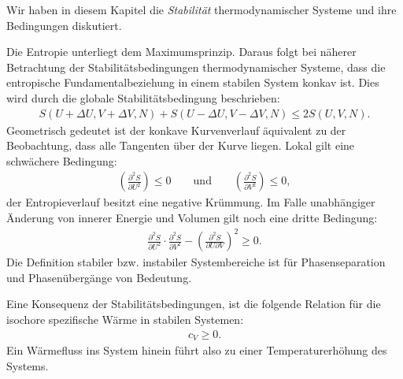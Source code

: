 \begin{summary}
	Wir haben in diesem Kapitel die \emph{Stabilität} thermodynamischer Systeme und ihre Bedingungen diskutiert.

	Die Entropie unterliegt dem Maximumsprinzip. Daraus folgt bei näherer Betrachtung der Stabilitätsbedingungen thermodynamischer Systeme, dass die entropische Fundamentalbeziehung in einem stabilen System konkav ist. Dies wird durch die globale Stabilitätsbedingung beschrieben:
	\begin{align*}
		S(U+\Delta U, V+\Delta V,N)+S(U-\Delta U, V-\Delta V,N)\leq2S(U,V,N).
	\end{align*}	
	Geometrisch gedeutet ist der konkave Kurvenverlauf äquivalent zu der Beobachtung, dass alle Tangenten über der Kurve liegen.
	Lokal gilt eine schwächere Bedingung: 
	\begin{align*}
		\left(\frac{\partial^2S}{\partial U^2}\right)\leq 0\qquad \mathrm{und} \qquad \left(\frac{\partial^2S}{\partial V^2}\right)\leq 0,
	\end{align*}
	der Entropieverlauf besitzt eine negative Krümmung. Im Falle unabhängiger Änderung von innerer Energie und Volumen gilt noch eine dritte Bedingung:
	\begin{align*}
		\frac{\partial ^2S}{\partial U^2}\cdot\frac{\partial ^2S}{\partial V^2}-\left(\frac{\partial ^2S}{\partial U\partial V}\right)^2\geq 0.
	\end{align*}
	Die Definition stabiler bzw. instabiler Systembereiche ist für Phasenseparation und Phasenübergänge von Bedeutung.
	
	Eine Konsequenz der Stabilitätsbedingungen, ist die folgende Relation für die isochore spezifische Wärme in stabilen Systemen:
	\begin{align*}
		c_V\geq 0.
	\end{align*}
	Ein  Wärmefluss ins System hinein führt also zu einer Temperaturerhöhung
	des Systems.


\end{summary}
